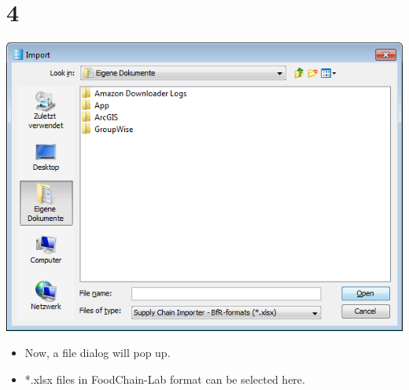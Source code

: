 \documentclass[10pt]{beamer}
\begin{document}
\section{4}
\begin{frame}
	\begin{center}
  		\includegraphics[height=0.6\textheight]{4.png}
	\end{center}
	\begin{itemize}
		\item Now, a file dialog will pop up.
		\item *.xlsx files in FoodChain-Lab format can be selected here.
	\end{itemize}
\end{frame}
\end{document}
